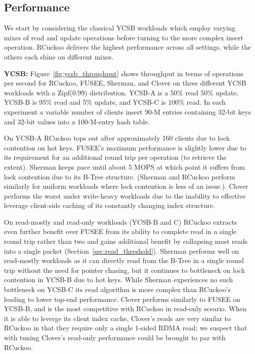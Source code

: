 


\subsection{Performance}

We start by considering the classical YCSB workloads which employ
varying mixes of read and update operations before turning to the more
complex insert operation.  RCuckoo delivers the highest performance
across all settings, while the others each shine on different
mixes.

\textbf{YCSB:}
Figure~\ref{fig:ycsb_throughput} shows throughput in terms of
operations per second for RCuckoo, FUSEE, Sherman, and Clover on
three different YCSB workloads with a Zipf(0.99) distribution. YCSB-A
is a 50\% read 50\% update, YCSB-B is 95\% read and 5\% update, and
YCSB-C is 100\% read.  In each experiment a variable number of clients
insert 90-M entries containing 32-bit keys and 32-bit values into a
100-M-entry hash table.


On YCSB-A RCuckoo tops out after approximately 160 clients due to lock
contention on hot keys.  FUSEE's maximum performance is slightly lower
due to its requirement for an additional round trip per operation (to
retrieve the extent). Sherman keeps pace until about 5 MOPS at which
point it suffers from lock contention due to its B-Tree structure.
(Sherman and RCuckoo perform similarly for uniform workloads where
lock contention is less of an issue.).  Clover performs the worst
under write-heavy workloads due to the inability to effective leverage
client-side caching of its constantly changing index structure.

On read-mostly and read-only workloads (YCSB-B and C)
RCuckoo extracts even further benefit over FUSEE from its ability to
complete read in a single round trip rather than two and gains
additional benefit by collapsing most reads into a single packet
(Section~\ref{sec:read_threshold}).  Sherman performs well on
read-mostly workloads as it can directly read from the B-Tree in a
single round trip without the need for pointer chasing, but it
continues to bottleneck on lock contention in YCSB-B due to hot
keys. While Sherman experiences no such bottleneck on YCSB-C its read
algorithm is more complex than RCuckoo's leading to lower top-end
performance. Clover performs similarly to FUSEE on YCSB-B, and is the
most competitive with RCuckoo in read-only sceario.  When it is able
to leverge its client index cache, Clover's reads are very similar to
RCuckoo in that they require only a single 1-sided RDMA read;  we
suspect that with tuning Clover's read-only performance
could be brought to par with RCuckoo.

